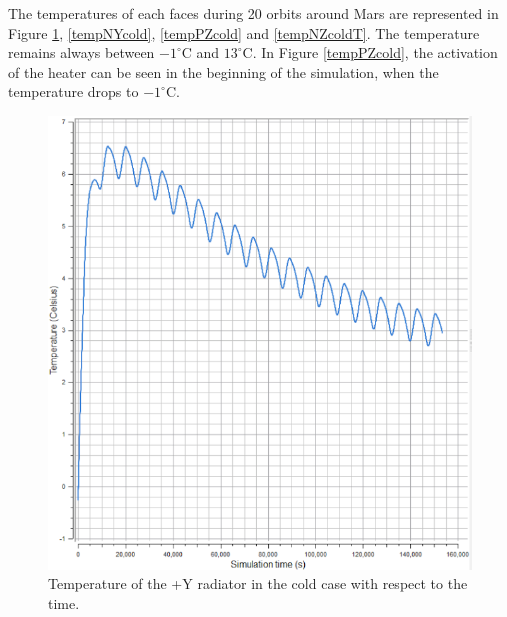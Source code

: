 \documentclass[a4paper, oneside, 11pt]{article}
\begin{document}
The temperatures of each faces during 20 orbits around Mars are represented in Figure \ref{tempPYcold}, \ref{tempNYcold}, \ref{tempPZcold} and \ref{tempNZcoldT}. The temperature remains always between $-1^{\circ}$C and $13^{\circ}$C. In Figure \ref{tempPZcold}, the activation of the heater can be seen in the beginning of the simulation, when the temperature drops to $-1^{\circ}$C.

\begin{figure}[!ht] 
\begin{minipage}{8cm}
\centering
\includegraphics[scale=0.38]{PYcold}
\centering
\caption{Temperature of the +Y radiator in the cold case with respect to the time.}
\label{tempPYcold}
\end{minipage} 
\medskip
\begin{minipage}{8cm}
\centering

\end{minipage}
\end{figure}
\end{document}
